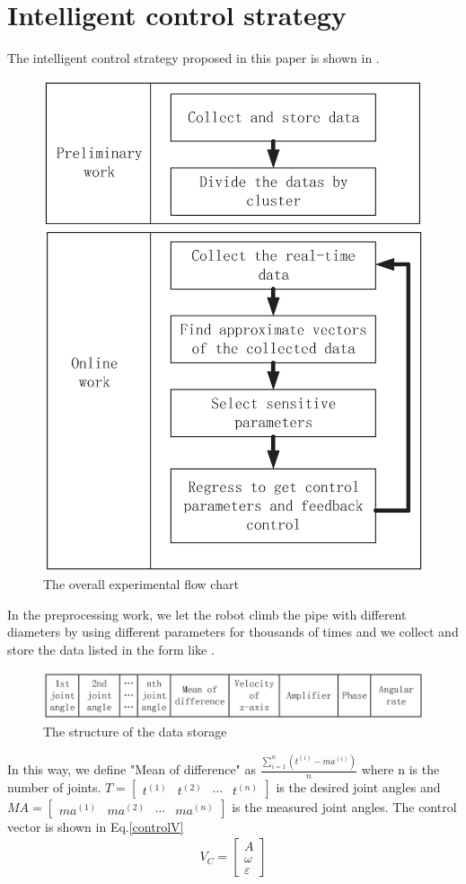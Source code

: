\section{Intelligent control strategy}

The intelligent control strategy proposed in this paper is shown in .
\begin{figure}[H]
	\centering
	\includegraphics[width=.7\linewidth]{fig/mainwork/stepMap}
	\caption{The overall experimental flow chart}
\end{figure}

 In the preprocessing work, we let the robot climb the pipe with different diameters by using different parameters for thousands of times and we collect and store the data listed in the form like .
\begin{figure}[H]
	\centering
	\includegraphics[width=\linewidth]{fig/mainwork/data}
	\caption{The structure of the data storage}
\end{figure}

In this way, we define "Mean of difference" as $\frac{\sum_{i=1}^{n}(t^{(i)}-ma^{(i)})}{n} $ where n is the number of joints. $T=\begin{bmatrix}
t^{(1)} & t^{(2)} & \cdots & t^{(n)}
\end{bmatrix}$ is the desired joint angles and $MA=\begin{bmatrix}
ma^{(1)} & ma^{(2)} & \cdots & ma^{(n)}
\end{bmatrix}$ is the measured joint angles. The control vector is shown in Eq.\ref{controlV}
\begin{eqnarray}\label{controlV}
V_C=\begin{bmatrix}
A\\ 
\omega\\
\varepsilon
\end{bmatrix}
\end{eqnarray}

